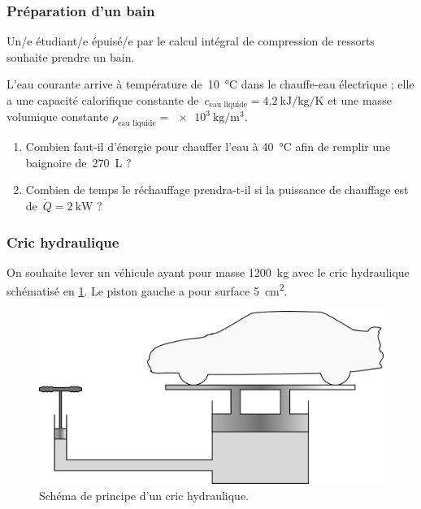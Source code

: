 \subsubsection{Préparation d’un bain}
\label{exo_bain}

	Un/e étudiant/e épuisé/e par le calcul intégral de compression de ressorts souhaite prendre un bain. 
	
	L’eau courante arrive à température de~\SI{10}{\degreeCelsius} dans le chauffe-eau électrique ; elle a une capacité calorifique constante de~$c_{\text{eau liquide}} = \SI{4,2}{\kilo\joule\per\kilogram\per\kelvin}$ et une masse volumique constante $\rho_{\text{eau liquide}} = \SI{e3}{\kilogram\per\metre\cubed}$.
	
	\begin{enumerate}
		\item Combien faut-il d’énergie pour chauffer l’eau à \SI{40}{\degreeCelsius} afin de remplir une baignoire de~\SI{270}{\liter} ?
		\item Combien de temps le réchauffage prendra-t-il si la puissance de chauffage est de~$\dot Q = \SI{+2}{\kilo\watt}$ ?
	\end{enumerate}



\subsubsection{Cric hydraulique}
\label{exo_cric}

	\wherefrom{[DS n°1 2012, 5pts]}

	On souhaite lever un véhicule ayant pour masse \SI{1200}{\kilogram} avec le cric hydraulique schématisé en \cref{fig_cric}. Le piston gauche a pour surface \SI{5}{\centi\metre\squared}.	

	\begin{figure}
		\begin{center}
			\includegraphics[width=12cm]{images/cric.png}
		\end{center}
		\caption{Schéma de principe d’un cric hydraulique.}
		\label{fig_cric}
	\end{figure}

